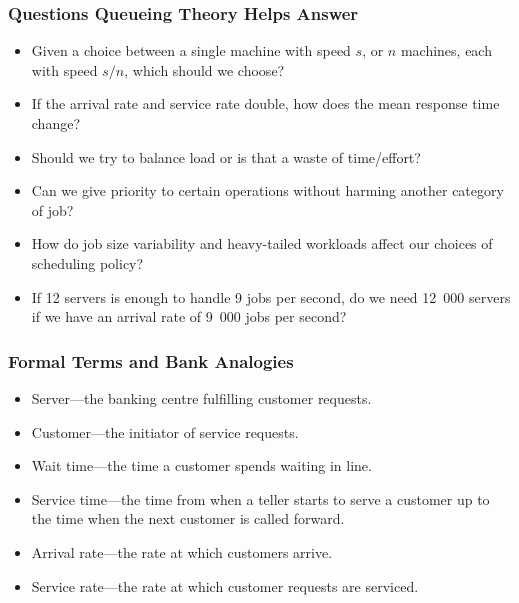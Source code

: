\begin{frame}
\frametitle{Questions Queueing Theory Helps Answer}

\begin{itemize}
 \item Given a choice between a single machine with speed $s$, or $n$ machines, each with speed $s/n$, which should we choose?
 \item If the arrival rate and service rate double, how does the mean response time change?
 \item Should we try to balance load or is that a waste of time/effort?
 \item Can we give priority to certain operations without harming another category of job?
 \item How do job size variability and heavy-tailed workloads affect our choices of scheduling policy?
 \item If 12 servers is enough to handle 9 jobs per second, do we need 12~000 servers if we have an arrival rate of 9~000 jobs per second?
\end{itemize}

\end{frame}



\begin{frame}
\frametitle{Formal Terms and Bank Analogies}

\begin{itemize}
	\item Server---the banking centre fulfilling customer requests.
	\item Customer---the initiator of service requests.
	\item Wait time---the time a customer spends waiting in line.
	\item Service time---the time from when a teller starts to serve a customer up to the time when the next customer is called forward.
	\item Arrival rate---the rate at which customers arrive.
	\item Service rate---the rate at which customer requests are serviced.

\end{itemize}

\end{frame}



